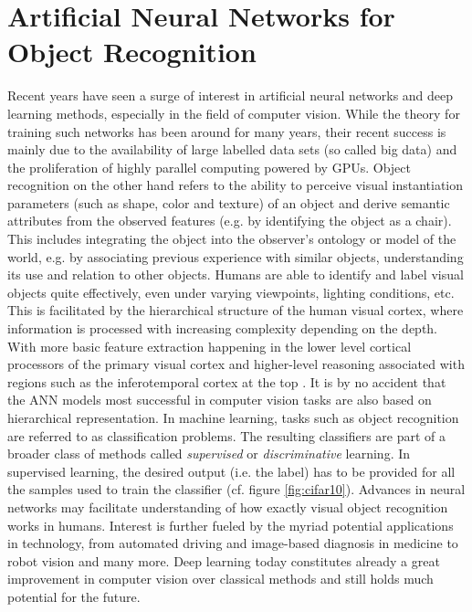 \section{Artificial Neural Networks for Object Recognition}
Recent years have seen a surge of interest in artificial neural networks and deep learning methods, especially in the field of computer vision. While the theory for training such networks has been around for many years, their recent success is mainly due to the availability of large labelled data sets (so called big data) and the proliferation of highly parallel computing powered by GPUs. Object recognition on the other hand refers to the ability to perceive visual instantiation parameters (such as shape, color and texture) of an object and derive semantic attributes from the observed features (e.g. by identifying the object as a chair). This includes integrating the object into the observer's ontology or model of the world, e.g. by associating previous experience with similar objects, understanding its use and relation to other objects. Humans are able to identify and label visual objects quite effectively, even under varying viewpoints, lighting conditions, etc.
This is facilitated by the hierarchical structure of the human visual cortex, where information is processed with increasing complexity depending on the depth. With more basic feature extraction happening in the lower level cortical processors of the primary visual cortex and higher-level reasoning associated with regions such as the inferotemporal cortex at the top \cite{marr1976early,bar2003cortical}.
It is by no accident that the ANN models most successful in computer vision tasks are also based on hierarchical representation. In machine learning, tasks such as object recognition are referred to as classification problems. The resulting classifiers are part of a broader class of methods called \emph{supervised} or \emph{discriminative} learning. In supervised learning, the desired output (i.e. the label) has to be provided for all the samples used to train the classifier (cf. figure \ref{fig:cifar10}).
Advances in neural networks may facilitate understanding of how exactly visual object recognition works in humans. Interest is further fueled by the myriad potential applications in technology, from automated driving and image-based diagnosis in medicine to robot vision and many more. Deep learning today constitutes already a great improvement in computer vision over classical methods and still holds much potential for the future.
